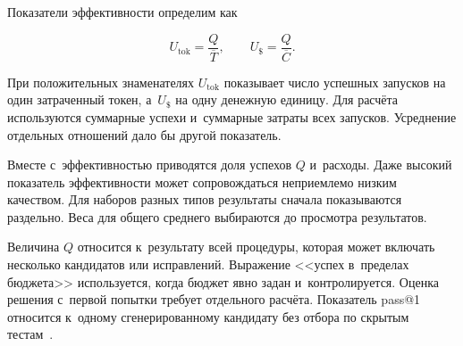 Показатели эффективности определим как
\begin{formulakey}
\begin{equation}
U_{\mathrm{tok}}=\frac{Q}{\overline{T}},\qquad
U_{\$}=\frac{Q}{\overline{C}}.
\label{eq:efficiency}
\end{equation}
\begin{symbols}
\end{symbols}
\end{formulakey}
При положительных знаменателях $U_{\mathrm{tok}}$ показывает число успешных запусков на один затраченный токен, а~$U_{\$}$ на одну денежную единицу. Для расчёта используются суммарные успехи и~суммарные затраты всех запусков. Усреднение отдельных отношений дало бы другой показатель.

Вместе с~эффективностью приводятся доля успехов $Q$ и~расходы. Даже высокий показатель эффективности может сопровождаться неприемлемо низким качеством. Для наборов разных типов результаты сначала показываются раздельно. Веса для общего среднего выбираются до просмотра результатов.

Величина $Q$ относится к~результату всей процедуры, которая может включать несколько кандидатов или исправлений. Выражение <<успех в~пределах бюджета>> используется, когда бюджет явно задан и~контролируется. Оценка решения с~первой попытки требует отдельного расчёта. Показатель pass@1 относится к~одному сгенерированному кандидату без отбора по скрытым тестам~\cite{chen2021humaneval}.

